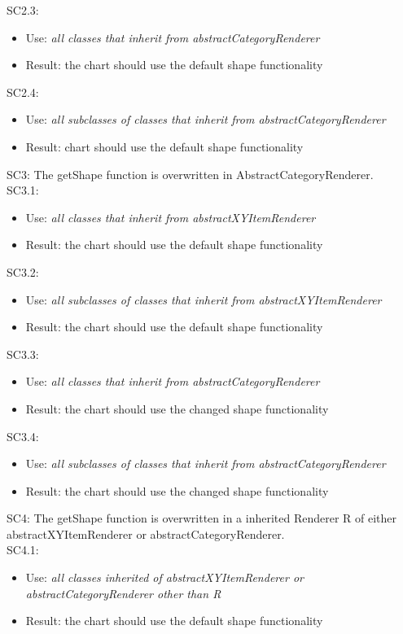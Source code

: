 \documentclass{article}
\begin{document}
SC2.3: 
\begin{itemize}
	\item Use: \textit{all classes that inherit from abstractCategoryRenderer}
	\item Result: the chart should use the default shape functionality
\end{itemize}
SC2.4: 
\begin{itemize}
	\item Use: \textit{all subclasses of classes that inherit from abstractCategoryRenderer}
	\item Result: chart should use the default shape functionality
\end{itemize}
SC3: The getShape function is overwritten in AbstractCategoryRenderer.\\
SC3.1: 
\begin{itemize}
	\item Use: \textit{all classes that inherit from abstractXYItemRenderer}
	\item Result: the chart should use the default shape functionality
\end{itemize}
SC3.2: 
\begin{itemize}
	\item Use: \textit{all subclasses of classes that inherit from abstractXYItemRenderer}
	\item Result: the chart should use the default shape functionality
\end{itemize}
SC3.3: 
\begin{itemize}
	\item Use: \textit{all classes that inherit from abstractCategoryRenderer}
	\item Result: the chart should use the changed shape functionality
\end{itemize}
SC3.4: 
\begin{itemize}
	\item Use: \textit{all subclasses of classes that inherit from abstractCategoryRenderer}
	\item Result: the chart should use the changed shape functionality
\end{itemize}
SC4: The getShape function is overwritten in a inherited Renderer R of either abstractXYItemRenderer or abstractCategoryRenderer.\\
SC4.1: 
\begin{itemize}
	\item Use: \textit{all classes inherited of abstractXYItemRenderer or abstractCategoryRenderer other than R}
	\item Result: the chart should use the default shape functionality
\end{itemize}
\end{document}
